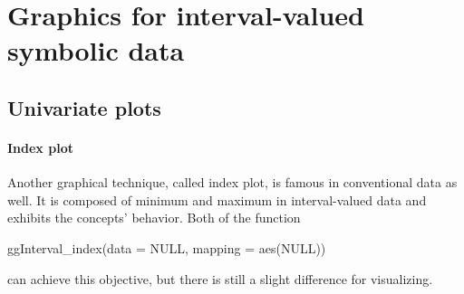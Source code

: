 \documentclass[article]{jss}
\begin{document}
\section{Graphics for interval-valued symbolic data} \label{sec:graphics}


\subsection{Univariate plots}


\paragraph{Index plot} 
Another graphical technique, called index plot, is famous in conventional data as well. It is composed of minimum and maximum in interval-valued data and exhibits the concepts' behavior. Both of the function

\begin{CodeChunk}
\begin{CodeInput}
ggInterval_index(data = NULL, mapping = aes(NULL))
\end{CodeInput}
\end{CodeChunk}
can achieve this objective, but there is still a slight difference for visualizing. 
\end{document}
